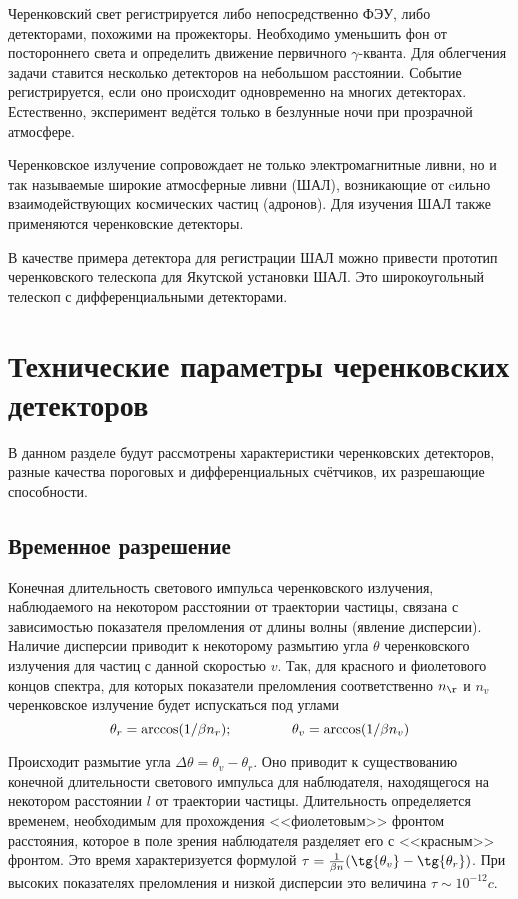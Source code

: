 \begin{Diplom-Main}
	Черенковский свет регистрируется либо непосредственно ФЭУ, либо детекторами, похожими на прожекторы. 
	Необходимо уменьшить фон от постороннего света и определить движение первичного $ \gamma $-кванта.
	 Для облегчения задачи ставится несколько детекторов на небольшом расстоянии. 
	Событие регистрируется, если оно происходит одновременно на многих детекторах.
	Естественно, эксперимент ведётся только в безлунные ночи при прозрачной атмосфере. 
	
	Черенковское излучение сопровождает не только электромагнитные ливни, но и так называемые широкие атмосферные ливни (ШАЛ), возникающие от cильно взаимодействующих космических частиц (адронов). Для изучения ШАЛ также применяются черенковские детекторы.
	
	В качестве примера детектора для регистрации ШАЛ можно привести прототип черенковского телескопа для Якутской установки ШАЛ. Это широкоугольный телескоп с дифференциальными детекторами. 
	
	\section{Технические параметры черенковских детекторов}
	\label{sec:section}
	В данном разделе будут рассмотрены характеристики черенковских детекторов, разные качества пороговых и дифференциальных счётчиков, их разрешающие способности.
	
	\subsection{Временное разрешение}
	\label{sec:subsection}
	Конечная длительность светового импульса черенковского излучения, наблюдаемого на некотором расстоянии от траектории частицы, связана с зависимостью показателя преломления от длины волны (явление дисперсии). Наличие дисперсии приводит к некоторому размытию угла $ \theta $ черенковского излучения для частиц с данной скоростью $ v $. Так, для красного и фиолетового концов спектра, для которых показатели преломления соответственно $n_{\r}$ и $n_v$ черенковское излучение будет испускаться под углами 
	$$\theta_r = \arccos({1/\beta n_r}); \hspace{1.5cm} \theta_v = \arccos({1/\beta n_v})$$	
	
	Происходит размытие угла $\Delta\theta = \theta_v - \theta_r$. Оно приводит к существованию конечной длительности светового импульса для наблюдателя, находящегося на некотором расстоянии $l$ от траектории частицы. Длительность определяется временем, необходимым для прохождения <<фиолетовым>> фронтом расстояния, которое в поле зрения наблюдателя разделяет его с <<красным>> фронтом.
	Это время характеризуется формулой $\tau = \frac{1}{\beta n}(\tg{\theta_v} - \tg{\theta_r})$. При высоких показателях преломления и низкой дисперсии это величина $\tau \sim 10^{-12} c$.
	

\end{Diplom-Main}
